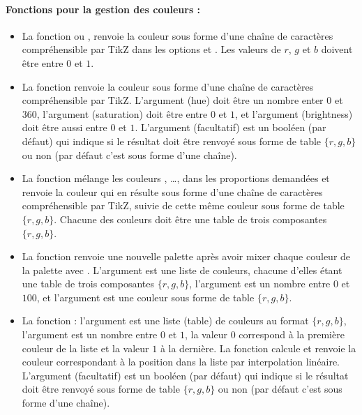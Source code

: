 \paragraph{Fonctions pour la gestion des couleurs :}
\begin{itemize}
    \item La fonction  ou , renvoie la couleur sous forme d'une chaîne de caractères compréhensible par TikZ dans les options  et . Les valeurs de $r$, $g$ et $b$ doivent être entre $0$ et $1$.
    
    \item La fonction  renvoie la couleur sous forme d'une chaîne de caractères compréhensible par TikZ. L'argument  (hue) doit être un nombre enter $0$ et $360$, l'argument  (saturation) doit être entre $0$ et $1$, et l'argument  (brightness) doit être aussi entre $0$ et $1$. L'argument (facultatif)  est un booléen (\false par défaut) qui indique si le résultat doit être renvoyé sous forme de table $\{r,g,b\}$ ou non (par défaut c'est sous forme d'une chaîne).
    
    \item La fonction  mélange les couleurs , \ldots,  dans les proportions demandées et renvoie la couleur qui en résulte sous forme d'une chaîne de caractères compréhensible par TikZ, suivie de cette même couleur sous forme de table $\{r,g,b\}$. Chacune des couleurs doit être une table de trois composantes $\{r,g,b\}$.
    
    \item La fonction  renvoie une nouvelle palette après avoir mixer chaque couleur de la palette  avec . L'argument  est une liste de couleurs, chacune d'elles étant une table de trois composantes $\{r,g,b\}$, l'argument  est un nombre entre $0$ et $100$, et l'argument  est une couleur sous forme de table $\{r,g,b\}$.
    
    \item La fonction  : l'argument  est une liste (table) de couleurs au format $\{r,g,b\}$, l'argument  est un nombre entre $0$ et $1$, la valeur $0$ correspond à la première couleur de la liste et la valeur $1$ à la dernière. La fonction calcule et renvoie la couleur correspondant à la position  dans la liste par interpolation linéaire. L'argument (facultatif)  est un booléen (\false par défaut) qui indique si le résultat doit être renvoyé sous forme de table $\{r,g,b\}$ ou non (par défaut c'est sous forme d'une chaîne).
    

\end{itemize}
